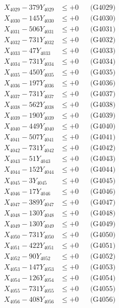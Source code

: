 \documentclass[a4paper,10pt]{article}
\begin{document}
{\begin{align}
X_{4029} - 379Y_{4029} &\leq +0 && \text{(G4029)} \\
X_{4030} - 145Y_{4030} &\leq +0 && \text{(G4030)} \\
\allowbreak
X_{4031} - 506Y_{4031} &\leq +0 && \text{(G4031)} \\
X_{4032} - 731Y_{4032} &\leq +0 && \text{(G4032)} \\
X_{4033} - 47Y_{4033} &\leq +0 && \text{(G4033)} \\
X_{4034} - 731Y_{4034} &\leq +0 && \text{(G4034)} \\
X_{4035} - 450Y_{4035} &\leq +0 && \text{(G4035)} \\
X_{4036} - 197Y_{4036} &\leq +0 && \text{(G4036)} \\
X_{4037} - 731Y_{4037} &\leq +0 && \text{(G4037)} \\
X_{4038} - 562Y_{4038} &\leq +0 && \text{(G4038)} \\
X_{4039} - 190Y_{4039} &\leq +0 && \text{(G4039)} \\
X_{4040} - 449Y_{4040} &\leq +0 && \text{(G4040)} \\
\allowbreak
X_{4041} - 507Y_{4041} &\leq +0 && \text{(G4041)} \\
X_{4042} - 731Y_{4042} &\leq +0 && \text{(G4042)} \\
X_{4043} - 51Y_{4043} &\leq +0 && \text{(G4043)} \\
X_{4044} - 152Y_{4044} &\leq +0 && \text{(G4044)} \\
X_{4045} - 3Y_{4045} &\leq +0 && \text{(G4045)} \\
X_{4046} - 17Y_{4046} &\leq +0 && \text{(G4046)} \\
X_{4047} - 389Y_{4047} &\leq +0 && \text{(G4047)} \\
X_{4048} - 130Y_{4048} &\leq +0 && \text{(G4048)} \\
X_{4049} - 130Y_{4049} &\leq +0 && \text{(G4049)} \\
X_{4050} - 731Y_{4050} &\leq +0 && \text{(G4050)} \\
\allowbreak
X_{4051} - 422Y_{4051} &\leq +0 && \text{(G4051)} \\
X_{4052} - 90Y_{4052} &\leq +0 && \text{(G4052)} \\
X_{4053} - 147Y_{4053} &\leq +0 && \text{(G4053)} \\
X_{4054} - 126Y_{4054} &\leq +0 && \text{(G4054)} \\
X_{4055} - 731Y_{4055} &\leq +0 && \text{(G4055)} \\
X_{4056} - 408Y_{4056} &\leq +0 && \text{(G4056)} \\

\end{align}}
\end{document}
